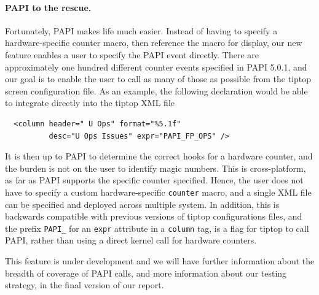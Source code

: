 \paragraph{PAPI to the rescue.}
Fortunately, PAPI makes life much easier.
Instead of having to specify a hardware-specific counter macro, then reference the macro for display, our new feature enables a user to specify the PAPI event directly.
There are approximately one hundred different counter events specified in PAPI 5.0.1, and our goal is to enable the user to call as many of those as possible from the tiptop screen configuration file.
As an example, the following declaration would be able to integrate directly into the tiptop XML file
\begin{verbatim}
  <column header=" U Ops" format="%5.1f"
          desc="U Ops Issues" expr="PAPI_FP_OPS" />
\end{verbatim}
It is then up to PAPI to determine the correct hooks for a hardware counter, and the burden is not on the user to identify magic numbers.
This is cross-platform, as far as PAPI supports the specific counter specified.
Hence, the user does not have to specify a custom hardware-specific \texttt{counter} macro, and a single XML file can be specified and deployed across multiple system.
In addition, this is backwards compatible with previous versions of tiptop configurations files, and the prefix \texttt{PAPI\_} for an \texttt{expr} attribute in a \texttt{column} tag, is a flag for tiptop to call PAPI, rather than using a direct kernel call for hardware counters.

This feature is under development and we will have further information about the breadth of coverage of PAPI calls, and more information about our testing strategy, in the final version of our report.